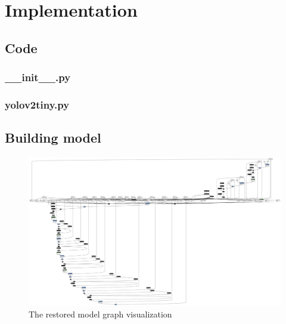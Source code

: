 \documentclass[a4paper,12pt]{article}
\begin{document}
\section{Implementation}

\subsection{Code}
\subsubsection{\_\_init\_\_.py}

\subsubsection{yolov2tiny.py}


\subsection{Building model}

\begin{figure}[t]
	\centering
	\includegraphics[width=\textwidth]{./model}
	\caption{The restored model graph visualization}
	\label{figure:graph}
\end{figure}
\end{document}
